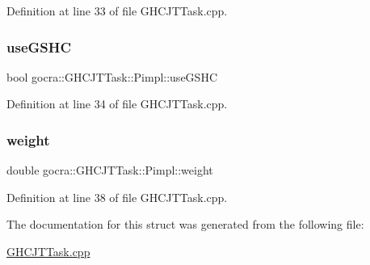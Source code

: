 Definition at line 33 of file G\+H\+C\+J\+T\+Task.\+cpp.

\hypertarget{structgocra_1_1GHCJTTask_1_1Pimpl_a0beb46ac94216a28202956bf87fc1d2d}{}\label{structgocra_1_1GHCJTTask_1_1Pimpl_a0beb46ac94216a28202956bf87fc1d2d} 
\subsubsection{\texorpdfstring{use\+G\+S\+HC}{useGSHC}}
{\footnotesize\ttfamily bool gocra\+::\+G\+H\+C\+J\+T\+Task\+::\+Pimpl\+::use\+G\+S\+HC}



Definition at line 34 of file G\+H\+C\+J\+T\+Task.\+cpp.

\hypertarget{structgocra_1_1GHCJTTask_1_1Pimpl_a5bf2a2e00bd9406bb6a993b616a47d07}{}\label{structgocra_1_1GHCJTTask_1_1Pimpl_a5bf2a2e00bd9406bb6a993b616a47d07} 
\subsubsection{\texorpdfstring{weight}{weight}}
{\footnotesize\ttfamily double gocra\+::\+G\+H\+C\+J\+T\+Task\+::\+Pimpl\+::weight}



Definition at line 38 of file G\+H\+C\+J\+T\+Task.\+cpp.



The documentation for this struct was generated from the following file\+:\begin{DoxyCompactItemize}
\item 
\hyperlink{GHCJTTask_8cpp}{G\+H\+C\+J\+T\+Task.\+cpp}\end{DoxyCompactItemize}
